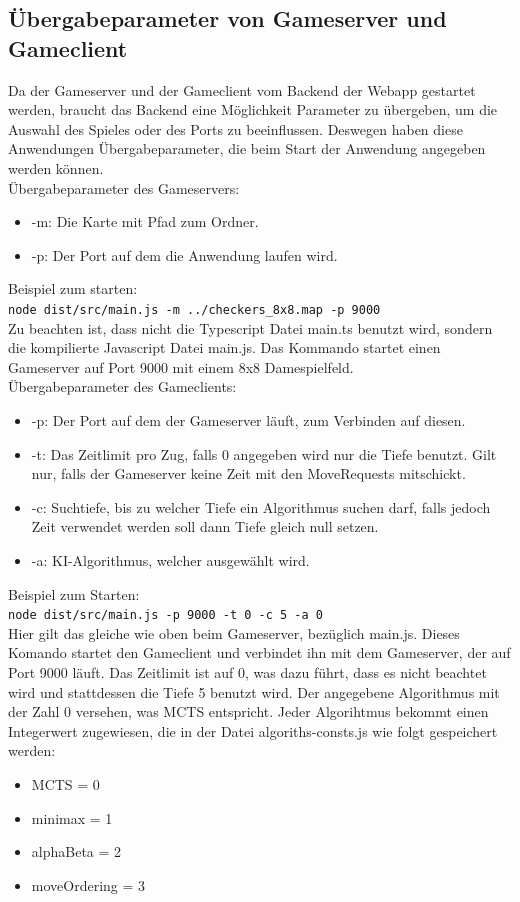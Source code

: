 \documentclass[12pt,a4paper,bibliography=totocnumbered,listof=totocnumbered]{article}
\begin{document}
\begin{appendix}
\section{Übergabeparameter von Gameserver und Gameclient}
\label{apx:Parameters}
Da der Gameserver und der Gameclient vom Backend der Webapp gestartet werden, braucht das Backend eine Möglichkeit Parameter zu übergeben, 
um die Auswahl des Spieles oder des Ports zu beeinflussen. Deswegen haben diese Anwendungen Übergabeparameter, die beim Start der
Anwendung angegeben werden können. 
\\
Übergabeparameter des Gameservers:
\\
\begin{itemize}
    \item -m: Die Karte mit Pfad zum Ordner.
    \item -p: Der Port auf dem die Anwendung laufen wird.
\end{itemize}
Beispiel zum starten:\\
\texttt{node dist/src/main.js -m ../checkers\_8x8.map -p 9000}\\
Zu beachten ist, dass nicht die Typescript Datei main.ts benutzt wird, sondern die kompilierte Javascript Datei main.js.
Das Kommando startet einen Gameserver auf Port 9000 mit einem 8x8 Damespielfeld.
\\
Übergabeparameter des Gameclients:
\begin{itemize}
    \item -p: Der Port auf dem der Gameserver läuft, zum Verbinden auf diesen.
    \item -t: Das Zeitlimit pro Zug, falls 0 angegeben wird nur die Tiefe benutzt. Gilt nur, falls der Gameserver
    keine Zeit mit den MoveRequests mitschickt.
    \item -c: Suchtiefe, bis zu welcher Tiefe ein Algorithmus suchen darf, falls jedoch Zeit verwendet werden soll dann Tiefe gleich null setzen.
    \item -a: KI-Algorithmus, welcher ausgewählt wird.
\end{itemize}
Beispiel zum Starten:\\
\texttt{node dist/src/main.js -p 9000 -t 0 -c 5 -a 0} \\
Hier gilt das gleiche wie oben beim Gameserver, bezüglich main.js. 
Dieses Komando startet den Gameclient und verbindet ihn mit dem Gameserver, der auf Port 9000 läuft. Das Zeitlimit ist auf 0, was dazu führt, dass es nicht beachtet wird
und stattdessen die Tiefe 5 benutzt wird. Der angegebene Algorithmus mit der Zahl 0 versehen, was MCTS entspricht.
Jeder Algorihtmus bekommt einen Integerwert zugewiesen, die in der Datei algoriths-consts.js wie folgt gespeichert werden: \\
\begin{itemize}
    \item MCTS = 0
    \item minimax = 1
    \item alphaBeta = 2
    \item moveOrdering = 3
\end{itemize}


\end{appendix}
\end{document}
